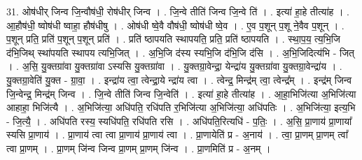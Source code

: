 \documentclass[17pt]{extarticle}
\begin{document}
31. ओष॑धीर् जिन्व जि॒न्वौष॑धी॒ रोष॑धीर् जिन्व । . जि॒न्वे तीति॑ जिन्व जि॒न्वे ति॑ । . इत्या॑ हा॒हे तीत्या॑ह । . आ॒हौष॑धी॒ ष्वोष॑धी ष्वाहा॒ हौष॑धीषु । . ओष॑धी ष्वे॒वै वौष॑धी॒ ष्वोष॑धी ष्वे॒व । . ए॒व प॒शून् प॒शू ने॒वैव प॒शून् । . प॒शून् प्रति॒ प्रति॑ प॒शून् प॒शून् प्रति॑ । . प्रति॑ ष्ठापयति स्थापयति॒ प्रति॒ प्रति॑ ष्ठापयति । . स्था॒प॒य॒ त्य॒भि॒जि द॑भि॒जिथ् स्था॑पयति स्थापय त्यभि॒जित् । . अ॒भि॒जि द॑स्य स्यभि॒जि द॑भि॒जि द॑सि । . अ॒भि॒जिदित्य॑भि - जित् । . अ॒सि॒ यु॒क्तग्रा॑वा यु॒क्तग्रा॑वा ऽस्यसि यु॒क्तग्रा॑वा । . यु॒क्तग्रा॒वेन्द्रा॒ येन्द्रा॑य यु॒क्तग्रा॑वा यु॒क्तग्रा॒वेन्द्रा॑य । . यु॒क्तग्रा॒वेति॑ यु॒क्त - ग्रा॒वा॒ । . इन्द्रा॑य त्वा॒ त्वेन्द्रा॒ये न्द्रा॑य त्वा । . त्वेन्द्र॒ मिन्द्र॑म् त्वा॒ त्वेन्द्र᳚म् । . इन्द्र॑म् जिन्व जि॒न्वेन्द्र॒ मिन्द्र॑म् जिन्व । . जि॒न्वे तीति॑ जिन्व जि॒न्वेति॑ । . इत्या॑ हा॒हे तीत्या॑ह । . आ॒हा॒भिजि॑त्या अ॒भिजि॑त्या आहाहा॒ भिजि॑त्यै । . अ॒भिजि॑त्या॒ अधि॑पति॒ रधि॑पति र॒भिजि॑त्या अ॒भिजि॑त्या॒ अधि॑पतिः । . अ॒भिजि॑त्या॒ इत्य॒भि - जि॒त्यै॒ । . अधि॑पति रस्य॒ स्यधि॑पति॒ रधि॑पति रसि । . अधि॑पति॒रित्यधि॑ - प॒तिः॒ । . अ॒सि॒ प्रा॒णाय॑ प्रा॒णाया᳚ स्यसि प्रा॒णाय॑ । . प्रा॒णाय॑ त्वा त्वा प्रा॒णाय॑ प्रा॒णाय॑ त्वा । . प्रा॒णायेति॑ प्र - अ॒नाय॑ । . त्वा॒ प्रा॒णम् प्रा॒णम् त्वा᳚ त्वा प्रा॒णम् । . प्रा॒णम् जि॑न्व जिन्व प्रा॒णम् प्रा॒णम् जि॑न्व । . प्रा॒णमिति॑ प्र - अ॒नम् । \newline
\end{document}

